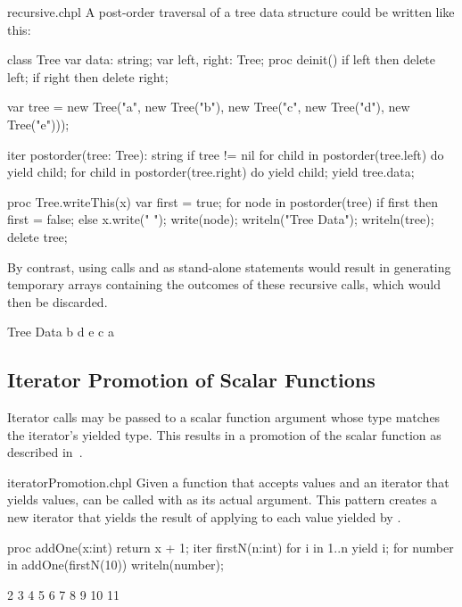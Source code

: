 \begin{chapelexample}{recursive.chpl}
A post-order traversal of a tree data structure could be written like this:
\begin{chapelnoprint}
class Tree {
  var data: string;
  var left, right: Tree;
  proc deinit() {
    if left then delete left;
    if right then delete right;
  }
}

var tree = new Tree("a", new Tree("b"), new Tree("c", new Tree("d"), new Tree("e")));
\end{chapelnoprint}
\begin{chapel}
iter postorder(tree: Tree): string {
  if tree != nil {
    for child in postorder(tree.left) do
      yield child;
    for child in postorder(tree.right) do
      yield child;
    yield tree.data;
  }
}
\end{chapel}
\begin{chapelnoprint}
proc Tree.writeThis(x)
{
  var first = true;
  for node in postorder(tree) {
    if first then first = false;
      else x.write(" ");
    write(node);
  }
}
writeln("Tree Data");
writeln(tree);
delete tree;
\end{chapelnoprint}
By contrast, using calls 
and  as stand-alone statements would
result in generating temporary arrays containing the outcomes of these
recursive calls, which would then be discarded.
\begin{chapeloutput}
Tree Data
b d e c a
\end{chapeloutput}
\end{chapelexample}

\subsection{Iterator Promotion of Scalar Functions}
\label{Iterator_Promotion_of_Scalar_Functions}

Iterator calls may be passed to a scalar function argument whose type
matches the iterator's yielded type.  This results in a promotion of the
scalar function as described in~.

\begin{chapelexample}{iteratorPromotion.chpl}
Given a function  that accepts  values
and an iterator  that yields  values,
 can be called with  as its actual argument.
This pattern creates a new iterator that yields the result of applying
 to each value yielded by .

\begin{chapel}
proc addOne(x:int) {
  return x + 1;
}
iter firstN(n:int) {
  for i in 1..n {
    yield i;
  }
}
for number in addOne(firstN(10)) {
  writeln(number);
}
\end{chapel}
\begin{chapeloutput}
2
3
4
5
6
7
8
9
10
11
\end{chapeloutput}

\end{chapelexample}

